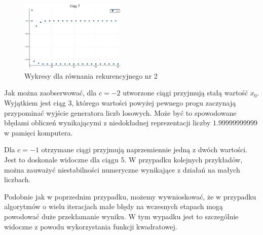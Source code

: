 \documentclass{article}
\begin{document}
\begin{figure}
\includegraphics[width=0.45\textwidth]{img/t6plots/7.png}
\caption{Wykresy dla równania rekurencyjnego nr 2}
\label{task6plots}
\end{figure}

Jak można zaobserwować, dla $c=-2$ utworzone ciągi przyjmują stałą wartość $x_0$.
Wyjątkiem jest ciąg 3, którego wartości powyżej pewnego progu zaczynają przypominać wyjście generatora liczb losowych.
Może być to spowodowane błędami obliczeń wynikającymi z niedokładnej reprezentacji liczby $1.99999999999$ w pamięci komputera.

Dla $c=-1$ otrzymane ciągi przyjmują naprzemiennie jedną z dwóch wartości.
Jest to doskonale widoczne dla ciągu 5.
W przypadku kolejnych przykładów, można zauważyć niestabilności numeryczne wynikające z działań na małych liczbach.

Podobnie jak w poprzednim przypadku, możemy wywnioskować, że w przypadku algorytmów o wielu iteracjach małe błędy na wczesnych etapach mogą powodować duże przekłamanie wyniku.
W tym wypadku jest to szczególnie widoczne z powodu wykorzystania funkcji kwadratowej.
\end{document}
